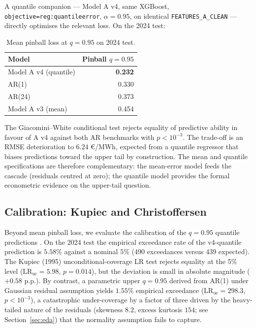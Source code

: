 \documentclass[11pt,a4paper]{article}
\begin{document}
A quantile companion --- Model A v4, same XGBoost,
\texttt{objective=reg:quantileerror}, $\alpha = 0.95$, on identical
\texttt{FEATURES\_A\_CLEAN} --- directly optimises the relevant
loss. On the 2024 test:

\begin{table}[H]
\centering
\small
\caption{Mean pinball loss at $q = 0.95$ on 2024 test.}
\begin{tabular}{lr}
\toprule
\textbf{Model} & \textbf{Pinball $q = 0.95$} \\
\midrule
Model A v4 (quantile) & \textbf{0.232} \\
AR(1)                  & 0.330 \\
AR(24)                 & 0.373 \\
Model A v3 (mean)      & 0.454 \\
\bottomrule
\end{tabular}
\end{table}

The Giacomini--White conditional test rejects equality of
predictive ability in favour of A v4 against both AR benchmarks with
$p < 10^{-3}$. The trade-off is an RMSE deterioration to
$6.24$ €/MWh, expected from a quantile regressor that biases
predictions toward the upper tail by construction. The mean and
quantile specifications are therefore complementary: the mean-error
model feeds the cascade (residuals centred at zero); the quantile
model provides the formal econometric evidence on the upper-tail
question.

\subsection{Calibration: Kupiec and Christoffersen}\label{sec:calibration}

Beyond mean pinball loss, we evaluate the calibration of the
$q = 0.95$ quantile predictions \citep{NowotarskiWeron2018}. On the
2024 test the empirical exceedance rate of the v4-quantile
prediction is $5.58\%$ against a nominal $5\%$ (490 exceedances
versus 439 expected). The Kupiec (1995) unconditional-coverage LR
test rejects equality at the 5\% level
($\mathrm{LR}_{\text{uc}} = 5.98$, $p = 0.014$), but the deviation
is small in absolute magnitude ($+0.58$ p.p.). By contrast, a
parametric upper $q = 0.95$ derived from AR(1) under Gaussian
residual assumption yields $1.55\%$ empirical exceedance
($\mathrm{LR}_{\text{uc}} = 298.3$, $p < 10^{-3}$), a catastrophic
under-coverage by a factor of three driven by the heavy-tailed
nature of the residuals
(skewness $8.2$, excess kurtosis $154$; see Section~\ref{sec:eda})
that the normality assumption fails to capture.
\end{document}
